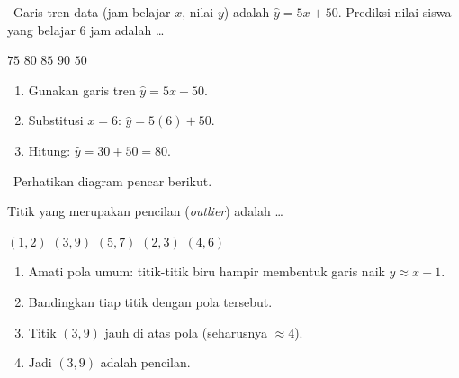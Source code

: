 \documentclass[11pt,a4paper]{exam}
\newenvironment{langkah}{%
  \begin{enumerate}[label=\textbf{Langkah \arabic*:},leftmargin=2.6em,
    itemsep=2pt,topsep=2pt]}{\end{enumerate}}
\newcommand{\Adv}{{\footnotesize\textsf{\textcolor{oranye}{[Advanced]}}}\ }
\begin{document}
\begin{questions}
\question \Adv Garis tren data (jam belajar $x$, nilai $y$) adalah $\hat{y} = 5x + 50$.
Prediksi nilai siswa yang belajar 6 jam adalah \dots
\begin{choices}
\choice $75$ \CorrectChoice $80$ \choice $85$ \choice $90$ \choice $50$
\end{choices}
\begin{solution}
\begin{langkah}
\item Gunakan garis tren $\hat{y} = 5x + 50$.
\item Substitusi $x = 6$: $\hat{y} = 5(6) + 50$.
\item Hitung: $\hat{y} = 30 + 50 = 80$.
\end{langkah}
\end{solution}

\question \Adv Perhatikan diagram pencar berikut.

\begin{center}
\end{center}

Titik yang merupakan pencilan (\emph{outlier}) adalah \dots
\begin{choices}
\choice $(1,2)$ \CorrectChoice $(3,9)$ \choice $(5,7)$ \choice $(2,3)$ \choice $(4,6)$
\end{choices}
\begin{solution}
\begin{langkah}
\item Amati pola umum: titik-titik biru hampir membentuk garis naik $y \approx x+1$.
\item Bandingkan tiap titik dengan pola tersebut.
\item Titik $(3,9)$ jauh di atas pola (seharusnya $\approx 4$).
\item Jadi $(3,9)$ adalah pencilan.
\end{langkah}
\end{solution}


\end{questions}
\end{document}
